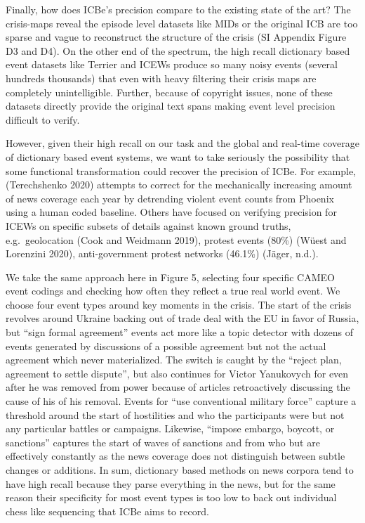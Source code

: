 \documentclass{article}
\begin{document}
Finally, how does ICBe's precision compare to the existing state of the
art? The crisis-maps reveal the episode level datasets like MIDs or the
original ICB are too sparse and vague to reconstruct the structure of
the crisis (SI Appendix Figure D3 and D4). On the other end of the
spectrum, the high recall dictionary based event datasets like Terrier
and ICEWs produce so many noisy events (several hundreds thousands) that
even with heavy filtering their crisis maps are completely
unintelligible. Further, because of copyright issues, none of these
datasets directly provide the original text spans making event level
precision difficult to verify.

However, given their high recall on our task and the global and
real-time coverage of dictionary based event systems, we want to take
seriously the possibility that some functional transformation could
recover the precision of ICBe. For example, (Terechshenko 2020) attempts
to correct for the mechanically increasing amount of news coverage each
year by detrending violent event counts from Phoenix using a human coded
baseline. Others have focused on verifying precision for ICEWs on
specific subsets of details against known ground truths,
e.g.~geolocation (Cook and Weidmann 2019), protest events (80\%) (Wüest
and Lorenzini 2020), anti-government protest networks (46.1\%) (Jäger,
n.d.).

We take the same approach here in Figure 5, selecting four specific
CAMEO event codings and checking how often they reflect a true real
world event. We choose four event types around key moments in the
crisis. The start of the crisis revolves around Ukraine backing out of
trade deal with the EU in favor of Russia, but ``sign formal agreement''
events act more like a topic detector with dozens of events generated by
discussions of a possible agreement but not the actual agreement which
never materialized. The switch is caught by the ``reject plan, agreement
to settle dispute'', but also continues for Victor Yanukovych for even
after he was removed from power because of articles retroactively
discussing the cause of his of his removal. Events for ``use
conventional military force'' capture a threshold around the start of
hostilities and who the participants were but not any particular battles
or campaigns. Likewise, ``impose embargo, boycott, or sanctions''
captures the start of waves of sanctions and from who but are
effectively constantly as the news coverage does not distinguish between
subtle changes or additions. In sum, dictionary based methods on news
corpora tend to have high recall because they parse everything in the
news, but for the same reason their specificity for most event types is
too low to back out individual chess like sequencing that ICBe aims to
record.
\end{document}
